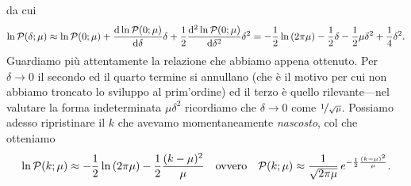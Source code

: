 da cui
\begin{align*}
  \ln\poissonpdf[\mu]{\delta} \approx \ln\poissonpdf[\mu]{0} +
  \td{\ln\poissonpdf[\mu]{0}}{\delta}{} \delta +
  \frac{1}{2}\td[2]{\ln\poissonpdf[\mu]{0}}{\delta}{}
  \delta^2 = -\frac{1}{2}\ln\left(2\pi \mu\right) - \frac{1}{2}\delta -
  \frac{1}{2}\mu\delta^2 + \frac{1}{4} \delta^2.
\end{align*}
Guardiamo più attentamente la relazione che abbiamo appena ottenuto. Per
$\delta \rightarrow 0$ il secondo ed il quarto termine si annullano (che è il
motivo per cui non abbiamo troncato lo sviluppo al prim'ordine) ed il terzo è
quello rilevante---nel valutare la forma indeterminata $\mu\delta^2$ ricordiamo
che $\delta \rightarrow 0$ come $\nicefrac{1}{\sqrt{\mu}}$. Possiamo adesso
ripristinare il $k$ che avevamo momentaneamente \emph{nascosto}, col che
otteniamo
\begin{align}\label{eq:poisson_gauss}
  \ln\poissonpdf[\mu]{k} \approx
  -\frac{1}{2}\ln\left(2\pi \mu\right) - \frac{1}{2}\frac{(k - \mu)^2}{\mu}
  \quad \text{ovvero} \quad
  \poissonpdf[\mu]{k} \approx
  \frac{1}{\sqrt{2\pi\mu}}\,e^{-\frac{1}{2}\frac{(k - \mu)^2}{\mu}}.
\end{align}

\begin{table}[!hbt]
\end{table}

